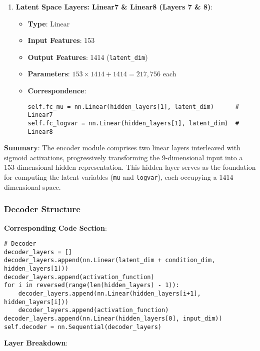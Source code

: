 \documentclass[10pt]{article}
\begin{document}
\begin{enumerate}
    \item \textbf{Latent Space Layers: Linear7 \& Linear8 (Layers 7 \& 8)}:
    \begin{itemize}
        \item \textbf{Type}: Linear
        \item \textbf{Input Features}: 153
        \item \textbf{Output Features}: 1414 (\texttt{latent\_dim})
        \item \textbf{Parameters}: \( 153 \times 1414 + 1414 = 217,756 \) each
        \item \textbf{Correspondence}:
        \begin{verbatim}
self.fc_mu = nn.Linear(hidden_layers[1], latent_dim)      # Linear7
self.fc_logvar = nn.Linear(hidden_layers[1], latent_dim)  # Linear8
        \end{verbatim}
    \end{itemize}
\end{enumerate}

\textbf{Summary}: The encoder module comprises two linear layers interleaved with sigmoid activations, progressively transforming the 9-dimensional input into a 153-dimensional hidden representation. This hidden layer serves as the foundation for computing the latent variables (\texttt{mu} and \texttt{logvar}), each occupying a 1414-dimensional space.

\subsubsection{Decoder Structure}

\textbf{Corresponding Code Section}:
\begin{verbatim}
# Decoder
decoder_layers = []
decoder_layers.append(nn.Linear(latent_dim + condition_dim, hidden_layers[1]))
decoder_layers.append(activation_function)
for i in reversed(range(len(hidden_layers) - 1)):
    decoder_layers.append(nn.Linear(hidden_layers[i+1], hidden_layers[i]))
    decoder_layers.append(activation_function)
decoder_layers.append(nn.Linear(hidden_layers[0], input_dim))
self.decoder = nn.Sequential(decoder_layers)
\end{verbatim}

\textbf{Layer Breakdown}:
\end{document}
